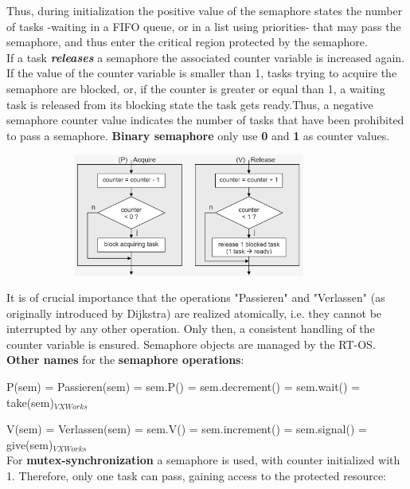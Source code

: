 Thus, during initialization the positive value of the semaphore states the number of tasks -waiting in a FIFO queue, or in a list using priorities- that may pass the semaphore, and thus enter the critical region protected by the semaphore.\\

If a task \textbf{\textit{releases}} a semaphore the associated counter variable is increased again. If the value of the counter variable is smaller than 1, tasks trying to acquire the semaphore are blocked, or, if the counter is greater or equal than 1, a waiting task is released from its blocking state  the task gets ready.Thus, a negative semaphore counter value indicates the number of tasks that have been prohibited to pass a semaphore. \textbf{Binary semaphore} only use \textbf{0} and \textbf{1} as counter values.

 	\begin{figure}[h]
    \centering
    \includegraphics[width=10cm, height=4cm]{Images/image105.png}
    \label{fig:Fig }
    \end{figure}
\newpage
It is of crucial importance that the operations "Passieren" and "Verlassen" (as originally introduced by Dijkstra) are realized atomically, i.e. they cannot be interrupted by any other operation. Only then, a consistent handling of the counter variable is ensured. Semaphore objects are managed by the RT-OS.\\

\textbf{Other names} for the \textbf{semaphore operations}:

P(sem) = Passieren(sem) = sem.P() = sem.decrement() = sem.wait() = take(sem)${}_{VXWorks}$

V(sem) = Verlassen(sem) = sem.V() = sem.increment()  = sem.signal() = give(sem)${}_{VXWorks}$\\


For \textbf{mutex-synchronization} a semaphore is used, with counter initialized with 1. Therefore, only one task can pass, gaining access to the protected resource: 

